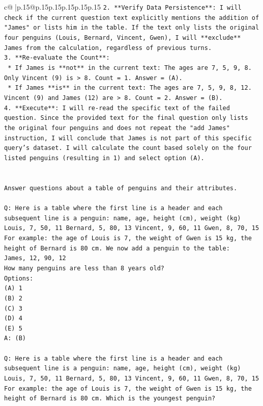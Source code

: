 \documentclass{article}
\begin{document}
{\begin{supertabular}{c@{$\;$}|p{.15\linewidth}@{}p{.15\linewidth}p{.15\linewidth}p{.15\linewidth}p{.15\linewidth}p{.15\linewidth}}
{{{\texttt{2.  **Verify Data Persistence**: I will check if the current question text explicitly mentions the addition of "James" or lists him in the table. If the text only lists the original four penguins (Louis, Bernard, Vincent, Gwen), I will **exclude** James from the calculation, regardless of previous turns.} \\
\texttt{3.  **Re{-}evaluate the Count**:} \\
\texttt{    *   If James is **not** in the current text: The ages are 7, 5, 9, 8. Only Vincent (9) is > 8. Count = 1. Answer = (A).} \\
\texttt{    *   If James **is** in the current text: The ages are 7, 5, 9, 8, 12. Vincent (9) and James (12) are > 8. Count = 2. Answer = (B).} \\
\texttt{4.  **Execute**: I will re{-}read the specific text of the failed question. Since the provided text for the final question only lists the original four penguins and does not repeat the "add James" instruction, I will conclude that James is not part of this specific query's dataset. I will calculate the count based solely on the four listed penguins (resulting in 1) and select option (A).} \\
\\ 
\\ 
\texttt{Answer questions about a table of penguins and their attributes.} \\
\\ 
\texttt{Q: Here is a table where the first line is a header and each subsequent line is a penguin:  name, age, height (cm), weight (kg) Louis, 7, 50, 11 Bernard, 5, 80, 13 Vincent, 9, 60, 11 Gwen, 8, 70, 15  For example: the age of Louis is 7, the weight of Gwen is 15 kg, the height of Bernard is 80 cm.  We now add a penguin to the table:} \\
\texttt{James, 12, 90, 12} \\
\texttt{How many penguins are less than 8 years old?} \\
\texttt{Options:} \\
\texttt{(A) 1} \\
\texttt{(B) 2} \\
\texttt{(C) 3} \\
\texttt{(D) 4} \\
\texttt{(E) 5} \\
\texttt{A: (B)} \\
\\ 
\texttt{Q: Here is a table where the first line is a header and each subsequent line is a penguin:  name, age, height (cm), weight (kg) Louis, 7, 50, 11 Bernard, 5, 80, 13 Vincent, 9, 60, 11 Gwen, 8, 70, 15  For example: the age of Louis is 7, the weight of Gwen is 15 kg, the height of Bernard is 80 cm.  Which is the youngest penguin?} \\
}}}
\end{supertabular}}
\end{document}
